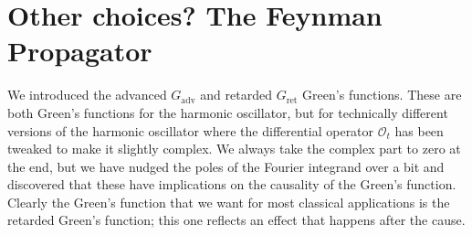 \documentclass[
  11pt,
	colorful,
	raggedright,
]{tufte-style-thesis-flip}
\begin{document}
\section{Other choices? The Feynman Propagator}

We introduced the advanced $G_\text{adv}$ and retarded $G_\text{ret}$ Green's functions. These are both Green's functions for the harmonic oscillator, but for technically different versions of the harmonic oscillator where the differential operator $\mathcal O_t$ has been tweaked to make it slightly complex. We always take the complex part to zero at the end, but we have nudged the poles of the Fourier integrand over a bit and discovered that these have implications on the causality of the Green's function. Clearly the Green's function that we want for most classical applications is the retarded Green's function; this one reflects an effect that happens after the cause.
\end{document}
